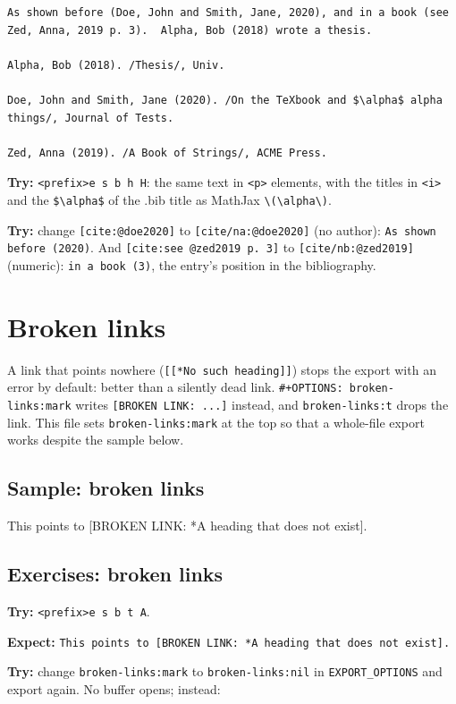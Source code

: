 \begin{verbatim}
As shown before (Doe, John and Smith, Jane, 2020), and in a book (see
Zed, Anna, 2019 p. 3).  Alpha, Bob (2018) wrote a thesis.

Alpha, Bob (2018). /Thesis/, Univ.

Doe, John and Smith, Jane (2020). /On the TeXbook and $\alpha$ alpha
things/, Journal of Tests.

Zed, Anna (2019). /A Book of Strings/, ACME Press.
\end{verbatim}

\textbf{Try:} \texttt{<prefix>e s b h H}: the same text in \texttt{<p>} elements, with the
titles in \texttt{<i>} and the \texttt{\$\textbackslash{}alpha\$} of the .bib title as MathJax
\texttt{\textbackslash{}(\textbackslash{}alpha\textbackslash{})}.

\textbf{Try:} change \texttt{[cite:@doe2020]} to \texttt{[cite/na:@doe2020]} (no author):
\texttt{As shown before (2020)}. And \texttt{[cite:see @zed2019 p. 3]} to
\texttt{[cite/nb:@zed2019]} (numeric): \texttt{in a book (3)}, the entry's position in
the bibliography.
\section{Broken links}
\label{sec:org1153bb5}
A link that points nowhere (\texttt{[[*No such heading]]}) stops the export with
an error by default: better than a silently dead link.
\texttt{\#+OPTIONS: broken-links:mark} writes \texttt{[BROKEN LINK: ...]} instead, and
\texttt{broken-links:t} drops the link. This file sets \texttt{broken-links:mark} at
the top so that a whole-file export works despite the sample below.
\subsection{Sample: broken links}
\label{sec:org8d32f2f}
This points to {[}BROKEN LINK: *A heading that does not exist].
\subsection{Exercises: broken links}
\label{sec:orgc78895d}
\textbf{Try:} \texttt{<prefix>e s b t A}.

\textbf{Expect:} \texttt{This points to [BROKEN LINK: *A heading that does not exist].}

\textbf{Try:} change \texttt{broken-links:mark} to \texttt{broken-links:nil} in
\texttt{EXPORT\_OPTIONS} and export again. No buffer opens; instead:

